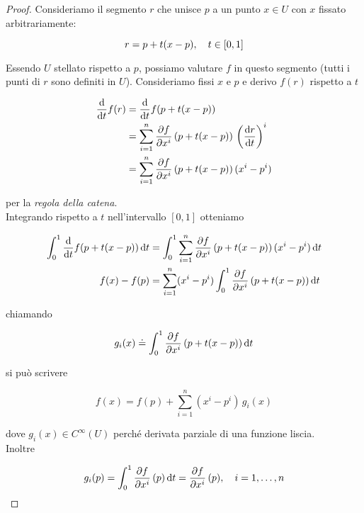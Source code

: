 \begin{proof}
	Consideriamo il segmento $ r $ che  unisce $ p $ a un punto $ x \in U $ con $ x $ fissato  arbitrariamente:
	
	\begin{equation}
		r=p+t(x-p) \qcomma t \in [0,1]
	\end{equation}
	
	Essendo $ U $ stellato rispetto a $ p $, possiamo valutare $ f $ in questo segmento (tutti i punti di $ r $ sono definiti in $ U $). Consideriamo fissi $ x $ e $ p $ e derivo $ f(r) $ rispetto a $ t $
	
	\begin{align}
		\begin{split}
			\dv{t} f(r) &= \dv{t} f(p+t(x-p)) \\
			&= \sum_{i=1}^{n} \pdv{f}{x^{i}} \, (p+t(x-p)) \, \left( \dv{r}{t} \right)^{i} \\
			&= \sum_{i=1}^{n} \pdv{f}{x^{i}} \, (p+t(x-p)) \, (x^{i}-p^{i})
		\end{split}
	\end{align}
	
	per la \textit{regola della catena}. \\
	Integrando rispetto a $ t $ nell'intervallo $ [0,1] $ otteniamo
	
	\begin{align}
		\begin{split}
			\int_{0}^{1} \dv{t} f(p+t(x-p)) \dd{t} &= \int_{0}^{1} \sum_{i=1}^{n} \pdv{f}{x^{i}} \, (p+t(x-p)) \, (x^{i}-p^{i}) \dd{t} \\
			f(x) - f(p) &= \sum_{i=1}^{n} (x^{i}-p^{i}) \int_{0}^{1} \pdv{f}{x^{i}} \, (p+t(x-p)) \dd{t}
		\end{split}
	\end{align}
	
	chiamando
	
	\begin{equation}
		g_{i}(x) \doteq \int_{0}^{1} \pdv{f}{x^{i}} \, (p+t(x-p)) \dd{t}
	\end{equation}
	
	si può scrivere
	
	\begin{equation}
		f(x)= f(p) + \sum_{i=1}^{n} (x^{i}-p^{i}) \, g_{i}(x)
	\end{equation}
	
	dove $ g_{i}(x) \in C^{\infty}(U) $ perché derivata parziale di una funzione liscia. \\
	Inoltre
	
	\begin{equation}
		g_{i}(p) = \int_{0}^{1} \pdv{f}{x^{i}} \, (p) \dd{t} = \pdv{f}{x^{i}} \, (p) \qcomma i=1,\dots,n
	\end{equation}
\end{proof}

